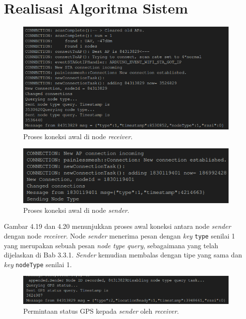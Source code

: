 \section{Realisasi Algoritma Sistem}
\begin{figure}[H]
	\centering
	\includegraphics[scale=0.5]{./assets/RealisasiSistem/FlyingReceiver/AwalConnect}
	\caption{Proses koneksi awal di node \textit{receiver}.}
\end{figure}
\begin{figure}[H]
	\centering
	\includegraphics[scale=0.5]{./assets/RealisasiSistem/Sender/KoneksiBaru}
	\caption{Proses koneksi awal di node \textit{sender}.}
\end{figure}
Gambar 4.19 dan 4.20 menunjukkan proses awal koneksi antara node \textit{sender} dengan node \textit{receiver}. Node \textit{sender} menerima pesan dengan \textit{key} \verb|type| senilai 1 yang merupakan sebuah pesan \textit{node type query}, sebagaimana yang telah dijelaskan di Bab 3.3.1. \textit{Sender} kemudian membalas dengan tipe yang sama dan \textit{key} \verb|nodeType| senilai 1.
\begin{figure}[H]
	\centering
	\includegraphics[scale=0.5]{./assets/RealisasiSistem/FlyingReceiver/GPSStatusQuery}
	\caption{Permintaan status GPS kepada \textit{sender} oleh \textit{receiver}.}
\end{figure}
